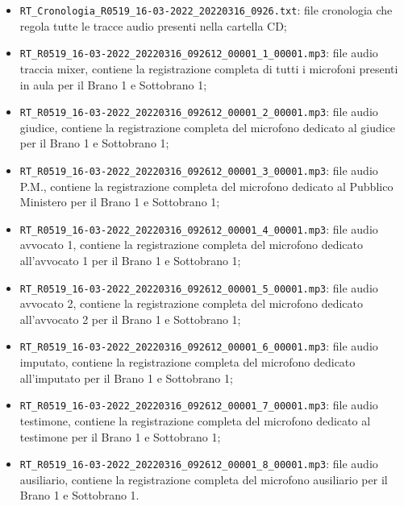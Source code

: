 \begin{itemize}
  \item \verb|RT_Cronologia_R0519_16-03-2022_20220316_0926.txt|: file cronologia che regola tutte le tracce audio presenti nella cartella CD;
  \item \verb|RT_R0519_16-03-2022_20220316_092612_00001_1_00001.mp3|: file audio traccia mixer, contiene la registrazione completa di tutti i microfoni presenti in aula per il Brano 1 e Sottobrano 1;
  \item \verb|RT_R0519_16-03-2022_20220316_092612_00001_2_00001.mp3|: file audio giudice, contiene la registrazione completa del microfono dedicato al giudice per il Brano 1 e Sottobrano 1;
  \item \verb|RT_R0519_16-03-2022_20220316_092612_00001_3_00001.mp3|: file audio P.M., contiene la registrazione completa del microfono dedicato al Pubblico Ministero per il Brano 1 e Sottobrano 1;
  \item \verb|RT_R0519_16-03-2022_20220316_092612_00001_4_00001.mp3|: file audio avvocato 1, contiene la registrazione completa del microfono dedicato all'avvocato 1 per il Brano 1 e Sottobrano 1;
  \item \verb|RT_R0519_16-03-2022_20220316_092612_00001_5_00001.mp3|: file audio avvocato 2, contiene la registrazione completa del microfono dedicato all'avvocato 2 per il Brano 1 e Sottobrano 1;
  \item \verb|RT_R0519_16-03-2022_20220316_092612_00001_6_00001.mp3|: file audio imputato, contiene la registrazione completa del microfono dedicato all'imputato per il Brano 1 e Sottobrano 1;
  \item \verb|RT_R0519_16-03-2022_20220316_092612_00001_7_00001.mp3|: file audio testimone, contiene la registrazione completa del microfono dedicato al testimone per il Brano 1 e Sottobrano 1;
  \item \verb|RT_R0519_16-03-2022_20220316_092612_00001_8_00001.mp3|: file audio ausiliario, contiene la registrazione completa del microfono ausiliario per il Brano 1 e Sottobrano 1.
\end{itemize}

